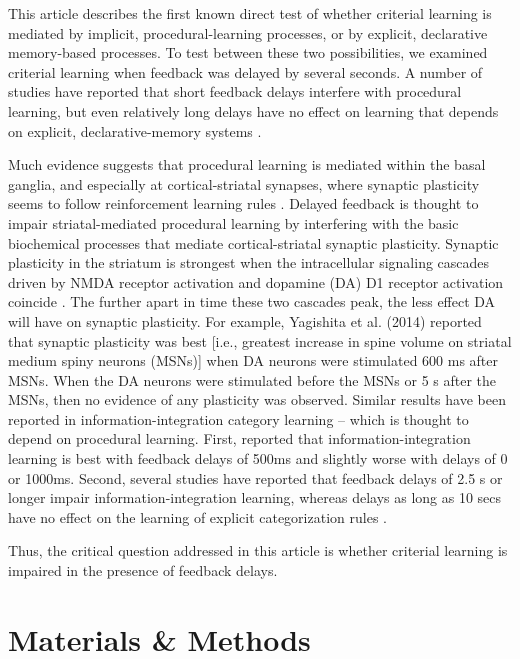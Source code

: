 \documentclass[jou,apacite]{apa6}
\begin{document}
This article describes the first known direct test of whether criterial learning
is mediated by implicit, procedural-learning processes, or by explicit,
declarative memory-based processes. To test between these two possibilities, we
examined criterial learning when feedback was delayed by several seconds. A
number of studies have reported that short feedback delays interfere with
procedural learning, but even relatively long delays have no effect on learning
that depends on explicit, declarative-memory systems \cite{dunn2012effect,
MaddoxAshbyBohil2003, MaddoxIng2005}.

Much evidence suggests that procedural learning is mediated within the basal
ganglia, and especially at cortical-striatal synapses, where synaptic plasticity
seems to follow reinforcement learning rules \cite{AshbyEnnis2006,
HoukAdamsBarto1995, MishkinEtAl1984, Willingham1998}. Delayed feedback is
thought to impair striatal-mediated procedural learning by interfering with the
basic biochemical processes that mediate cortical-striatal synaptic plasticity.
Synaptic plasticity in the striatum is strongest when the intracellular
signaling cascades driven by NMDA receptor activation and dopamine (DA) D1
receptor activation coincide \cite{LismanSchulmanCline2002, Rudy2014}. The
further apart in time these two cascades peak, the less effect DA will have on
synaptic plasticity. For example, Yagishita et al.
(2014\nocite{YagishitaEtAl2014}) reported that synaptic plasticity was best
[i.e., greatest increase in spine volume on striatal medium spiny neurons
(MSNs)] when DA neurons were stimulated 600 ms after MSNs. When the DA neurons
were stimulated before the MSNs or 5 s after the MSNs, then no evidence of any
plasticity was observed. Similar results have been reported in
information-integration category learning -- which is thought to depend on
procedural learning. First,  reported that
information-integration learning is best with feedback delays of 500ms and
slightly worse with delays of 0 or 1000ms. Second, several studies have reported
that feedback delays of 2.5 s or longer impair information-integration learning,
whereas delays as long as 10 secs have no effect on the learning of explicit
categorization rules \cite{dunn2012effect, MaddoxAshbyBohil2003, MaddoxIng2005}.

Thus, the critical question addressed in this article is whether criterial
learning is impaired in the presence of feedback delays. 

\section{Materials \& Methods}
\end{document}
